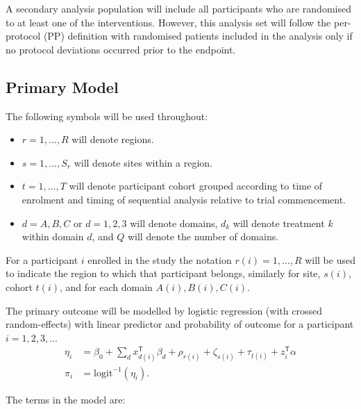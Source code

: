 \documentclass[
  11pt,
]{article}
\providecommand{\tightlist}{%
  \setlength{\itemsep}{0pt}\setlength{\parskip}{0pt}}
\begin{document}
A secondary analysis population will include all participants who are randomised to at least one of the interventions.
However, this analysis set will follow the per-protocol (PP) definition with randomised patients included in the analysis only if no protocol deviations occurred prior to the endpoint.

\hypertarget{primary-model}{%
\subsection{Primary Model}\label{primary-model}}

The following symbols will be used throughout:

\begin{itemize}
\tightlist
\item
  \(r=1,...,R\) will denote regions.
\item
  \(s=1,...,S_r\) will denote sites within a region.
\item
  \(t=1,...,T\) will denote participant cohort grouped according to time of enrolment and timing of sequential analysis relative to trial commencement.
\item
  \(d=A,B,C\) or \(d=1,2,3\) will denote domains, \(d_k\) will denote treatment \(k\) within domain \(d\), and \(Q\) will denote the number of domains.
\end{itemize}

For a participant \(i\) enrolled in the study the notation \(r(i)=1,...,R\) will be used to indicate the region to which that participant belongs, similarly for site, \(s(i)\), cohort \(t(i)\), and for each domain \(A(i),B(i),C(i)\).

The primary outcome will be modelled by logistic regression (with crossed random-effects) with linear predictor and probability of outcome for a participant \(i=1,2,3,...\)
\[
\begin{aligned}
\eta_i &= \beta_0 + \sum_{d} x_{d(i)}^\mathsf{T}\beta_d + \rho_{r(i)} + \zeta_{s(i)} + \tau_{t(i)} + z_i^{\mathsf{T}}\alpha\\
\pi_i &= \text{logit}^{-1}(\eta_i).
\end{aligned}
\]

The terms in the model are:
\end{document}
